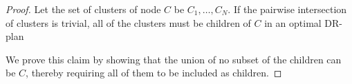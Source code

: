 \begin{proof}







    \medskip\noindent
    Let the set of clusters of node $C$ be $C_1,\ldots,C_N$. If the pairwise intersection of clusters is trivial, all of the clusters must be children of $C$ in an optimal DR-plan

    We prove this claim by showing that the union of no subset of the children can be $C$, thereby requiring all of them to be included as children.


\end{proof}
